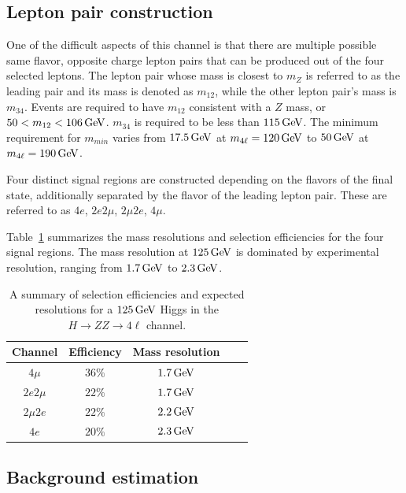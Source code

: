 \subsection{Lepton pair construction}

One of the difficult aspects of this channel is that there are multiple possible same flavor, opposite charge lepton pairs that can be produced out of the four selected leptons. The lepton pair whose mass is closest to $m_Z$ is referred to as the leading pair and its mass is denoted as $m_{12}$, while the other lepton pair's mass is $m_{34}$. Events are required to have $m_{12}$ consistent with a $Z$ mass, or $50 < m_{12} < 106 \GeV$. $m_{34}$ is required to be less than $115 \GeV$. The minimum requirement for $m_{min}$ varies from $17.5 \GeV$ at $m_{4\ell} = 120 \GeV$ to $50 \GeV$ at $m_{4\ell} = 190 \GeV$. 

Four distinct signal regions are constructed depending on the flavors of the final state, additionally separated by the flavor of the leading lepton pair. These are referred to as $4e$, $2e2\mu$, $2\mu2e$, $4\mu$. 

Table~\ref{tab:disc_zz_summary} summarizes the mass resolutions and selection efficiencies for the four signal regions. The mass resolution at $125 \GeV$ is dominated by experimental resolution, ranging from $1.7 \GeV$ to $2.3 \GeV$. 

\begin{table}[h!]
\centering
\captionsetup{justification=centering}

\hspace{-10pt}
\begin{tabular}{|c|c|c|c|c|}
\hline
Channel & Efficiency & Mass resolution \\ \hline
$4\mu$ & $36\%$ & $1.7 \GeV$ \\ \hline
$2e2\mu$ & $22\%$ & $1.7 \GeV$ \\ \hline
$2\mu2e$ & $22\%$ & $2.2\GeV$ \\ \hline
$4e$ & $20\%$ & $2.3\GeV$ \\ \hline 
\end{tabular}

\caption{
A summary of selection efficiencies and expected resolutions for a $125 \GeV$ Higgs in the $H\to ZZ\to 4\ell$ channel\cite{Discovery}. 
}
\label{tab:disc_zz_summary}
\end{table}

\subsection{Background estimation}

